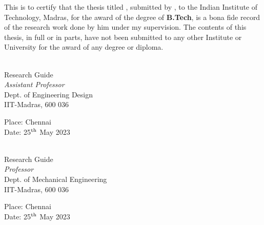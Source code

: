 \documentclass[BTech]{iitmdiss}
\begin{document}
    \certificate

    \vspace*{0.5in}

    \noindent This is to certify that the thesis titled {\bf \titleText}, submitted by {\bf \authorText},
    to the Indian Institute of Technology, Madras, for
    the award of the degree of {\bf B.Tech}, is a bona fide
    record of the research work done by him under my supervision. The
    contents of this thesis, in full or in parts, have not been submitted
    to any other Institute or University for the award of any degree or
    diploma.

    \vspace*{1.5in}

    \begin{paracol}{2}
        \begin{singlespacing}
            \hspace*{-0.25in}
            \parbox{2.5in}{
                 \\
                \noindent Research Guide \\
                \noindent \textit{Assistant Professor} \\
                \noindent Dept. of Engineering Design\\
                \noindent IIT-Madras, 600 036
            }
            \hspace*{1.56in}

            \vspace*{0.3in}
            \noindent Place: Chennai\\
            Date: 25$^{\textnormal{th}}$ May 2023

        \end{singlespacing}

        \switchcolumn
        \begin{singlespacing}
            \hspace*{-0.25in}
            \parbox{2.5in}{
                 \\
                \noindent Research Guide \\
                \noindent \textit{Professor} \\
                \noindent Dept. of Mechanical Engineering\\
                \noindent IIT-Madras, 600 036
            }
            \hspace*{1.56in}

            \vspace*{0.3in}
            \noindent Place: Chennai\\
            Date: 25$^{\textnormal{th}}$ May 2023

        \end{singlespacing}

    \end{paracol}
\end{document}
